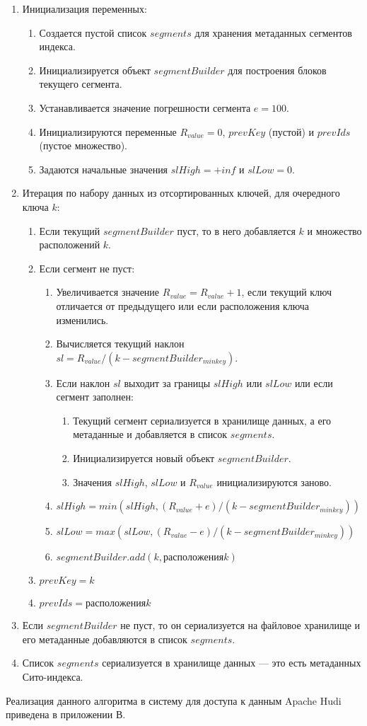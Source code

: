 \begin{enumerate}
\item Инициализация переменных:
    \begin{enumerate}
    \item Создается пустой список $segments$ для хранения метаданных сегментов индекса.
    \item Инициализируется объект $segmentBuilder$ для построения блоков текущего сегмента.
    \item Устанавливается значение погрешности сегмента $e = 100$.
    \item Инициализируются переменные $R_{value} = 0$, $prevKey$ (пустой) и $prevIds$ (пустое множество).
    \item Задаются начальные значения $slHigh = +inf$ и $slLow = 0$.
    \end{enumerate}

\item Итерация по набору данных из отсортированных ключей, для очередного ключа $k$:
    \begin{enumerate}
    \item Если текущий $segmentBuilder$ пуст, то в него добавляется $k$ и множество расположений $k$.
    \item Если сегмент не пуст:
        \begin{enumerate}
        \item Увеличивается значение $R_{value} = R_{value} + 1$, если текущий ключ отличается от предыдущего или если расположения ключа изменились.
        \item Вычисляется текущий наклон $sl =  R_{value} / (k - segmentBuilder_{minkey})$.
        \item Если наклон $sl$ выходит за границы $slHigh$ или $slLow$ или если сегмент заполнен:
            \begin{enumerate}
            \item Текущий сегмент сериализуется в хранилище данных, а его метаданные и добавляется в список $segments$.
            \item Инициализируется новый объект $segmentBuilder$.
            \item Значения $slHigh$, $slLow$ и $R_{value}$ инициализируются заново.
            \end{enumerate}
        \item $slHigh = min(slHigh, (R_{value} + e) / (k - segmentBuilder_{minkey}))$
        \item $slLow = max(slLow, (R_{value} - e) / (k - segmentBuilder_{minkey}))$
        \item $segmentBuilder.add(k, расположения k)$
        \end{enumerate}
    \item $prevKey = k$
    \item $prevIds = расположения k$
    \end{enumerate}
\item Если $segmentBuilder$ не пуст, то он сериализуется на файловое хранилище и его метаданные добавляются в список $segments$.
\item Список $segments$ сериализуется в хранилище данных --- это есть метаданных Сито-индекса.
\end{enumerate}

Реализация данного алгоритма в систему для доступа к данным Apache Hudi приведена в приложении В.
